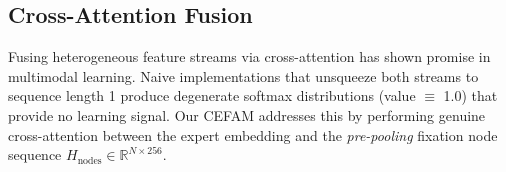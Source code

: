 \subsection{Cross-Attention Fusion}
Fusing heterogeneous feature streams via cross-attention has shown promise in multimodal learning. Naive implementations that unsqueeze both streams to sequence length 1 produce degenerate softmax distributions (value $\equiv$ 1.0) that provide no learning signal. Our CEFAM addresses this by performing genuine cross-attention between the expert embedding and the \textit{pre-pooling} fixation node sequence $H_\text{nodes} \in \mathbb{R}^{N \times 256}$.
